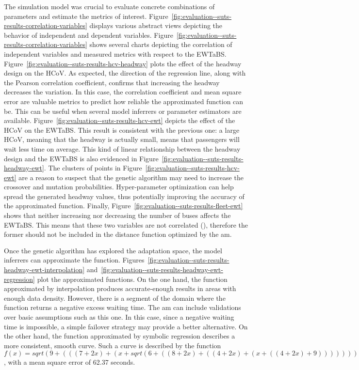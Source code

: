 The simulation model was crucial to evaluate concrete combinations of parameters and estimate the metrics of interest. Figure~\ref{fig:evaluation--suts-results-correlation-variables} displays various abstract views depicting the behavior of independent and dependent variables. Figure~\ref{fig:evaluation--suts-results-correlation-variables} shows several charts depicting the correlation of independent variables and measured metrics with respect to the \gls{EWTaBS}. Figure~\ref{fig:evaluation--suts-results-hcv-headway} plots the effect of the headway design on the \gls{HCoV}. As expected, the direction of the regression line, along with the Pearson correlation coefficient, confirms that increasing the headway decreases the variation. In this case, the correlation coefficient and mean square error are valuable metrics to predict how reliable the approximated function can be. This can be useful when several model inferrers or parameter estimators are available. Figure~\ref{fig:evaluation--suts-results-hcv-ewt} depicts the effect of the \gls{HCoV} on the \gls{EWTaBS}. This result is consistent with the previous one: a large \gls{HCoV}, meaning that the headway is actually small, means that passengers will wait less time on average. This kind of linear relationship between the headway design and the \gls{EWTaBS} is also evidenced in Figure~\ref{fig:evaluation--suts-results-headway-ewt}. The clusters of points in Figure~\ref{fig:evaluation--suts-results-hcv-ewt} are a reason to suspect that the genetic algorithm may need to increase the crossover and mutation probabilities. Hyper-parameter optimization can help spread the generated headway values, thus potentially improving the accuracy of the approximated function. Finally, Figure~\ref{fig:evaluation--suts-results-fleet-ewt} shows that neither increasing nor decreasing the number of buses affects the \gls{EWTaBS}. This means that these two variables are not correlated (), therefore the former should not be included in the distance function optimized by the \gls{am}.

Once the genetic algorithm has explored the adaptation space, the model inferrers can approximate the function. Figures~\ref{fig:evaluation--suts-results-headway-ewt-interpolation} and~\ref{fig:evaluation--suts-results-headway-ewt-regression} plot the approximated functions. On the one hand, the function approximated by interpolation produces accurate-enough results in areas with enough data density. However, there is a segment of the domain where the function returns a negative excess waiting time. The \gls{am} can include validations over basic assumptions such as this one. In this case, since a negative waiting time is impossible, a simple failover strategy may provide a better alternative. On the other hand, the function approximated by symbolic regression describes a more consistent, smooth curve. Such a curve is described by the function $f(x)=sqrt(9 + (((7 + 2x) + (x + sqrt(6 + ((8 + 2x) + ((4 + 2x) + (x + ((4 + 2x) + 9))))))) + (6 + ((9 + (x + ((6 + 2x) + 6))) + 2x))))$, with a mean square error of 62.37 seconds.

